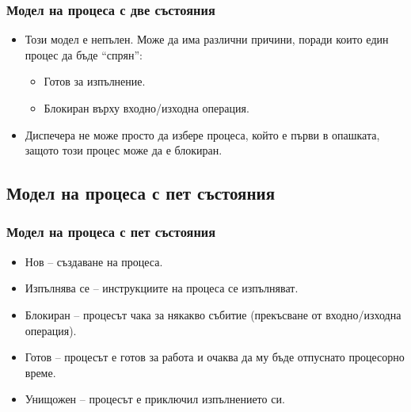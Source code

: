 \documentclass[ignorenonframetext, hyperref=unicode]{beamer}
\begin{document}
\begin{frame}\frametitle{Модел на процеса с две състояния}
\begin{figure}[h]
\center
{}
\end{figure}
\begin{itemize}
\item Този модел е непълен. Може да има различни причини, поради които един
процес да бъде ``спрян'':
\begin{itemize}
  \item Готов за изпълнение.
  \item Блокиран върху входно/изходна операция.
\end{itemize}
\item Диспечера не може просто да избере процеса, който е първи в опашката,
защото този процес може да е блокиран.
\end{itemize}
\end{frame}

\subsection{Модел на процеса с пет състояния}


\begin{frame}\frametitle{Модел на процеса с пет състояния}
\begin{itemize}
\item Нов -- създаване на процеса.
\item Изпълнява се -- инструкциите на процеса се изпълняват.
\item Блокиран -- процесът чака за някакво събитие (прекъсване от входно/изходна
операция).
\item Готов -- процесът е готов за работа и очаква да му бъде отпуснато
процесорно време.
\item Унищожен -- процесът е приключил изпълнението си.
\end{itemize}
\begin{figure}[h]
\center
{}
\end{figure}
\end{frame}
\end{document}
